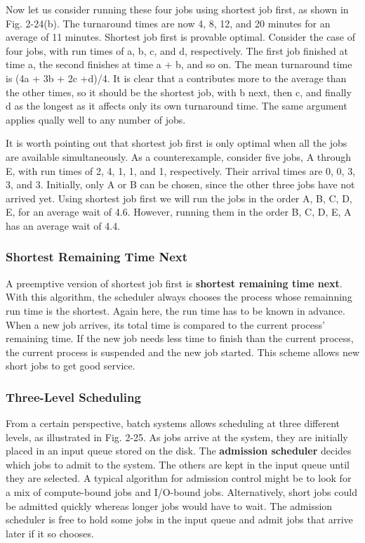 \documentclass{book}
\newcommand {\kw}  [1] {\textbf{#1}}
\begin{document}
Now let us consider running these four jobs using shortest job first, as shown in Fig. 2-24(b).
The turnaround times are now 4, 8, 12, and 20 minutes for an average of 11 minutes.
Shortest job first is provable optimal.
Consider the case of four jobs, with run times of a, b, c, and d, respectively.
The first job finished at time a, the second finishes at time a + b, and so on.
The mean turnaround time is (4a + 3b + 2c +d)/4.
It is clear that a contributes more to the average than the other times, so it should be the shortest job,
with b next, then c, and finally d as the longest as it affects only its own turnaround time.
The same argument applies qually well to any number of jobs.

It is worth pointing out that shortest job first is only optimal when all the jobs are available simultaneously.
As a counterexample, consider five jobs, A through E, with run times of 2, 4, 1, 1, and 1, respectively.
Their arrival times are 0, 0, 3, 3, and 3.
Initially, only A or B can be chosen, since the other three jobs have not arrived yet.
Using shortest job first we will run the jobs in the order A, B, C, D, E, for an average wait of 4.6.
However, running them in the order B, C, D, E, A has an average wait of 4.4.

\subsubsection*{Shortest Remaining Time Next}
A preemptive version of shortest job first is \kw{shortest remaining time next}.
With this algorithm, the scheduler always chooses the process whose remainning run time is the shortest.
Again here, the run time has to be known in advance.
When a new job arrives, its total time is compared to the current process' remaining time.
If the new job needs less time to finish than the current process, the current process is suspended and the new job started.
This scheme allows new short jobs to get good service.

\subsubsection*{Three-Level Scheduling}
From a certain perspective, batch systems allows scheduling at three different levels, as illustrated in Fig. 2-25.
As jobs arrive at the system, they are initially placed in an input queue stored on the disk.
The \kw{admission scheduler} decides which jobs to admit to the system.
The others are kept in the input queue until they are selected.
A typical algorithm for admission control might be to look for a mix of compute-bound jobs and I/O-bound jobs.
Alternatively, short jobs could be admitted quickly whereas longer jobs would have to wait.
The admission scheduler is free to hold some jobs in the input queue and admit jobs that arrive later if it so chooses.
\end{document}
